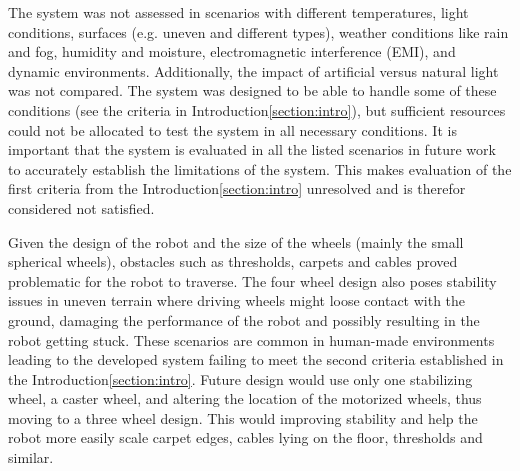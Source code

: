 \begin{comment}
As seen in the Results\:\ref{section:results}, the system achieved consistent SLAM maps during testing scenarios lasting over one hour. The fifth criteria (see Introduction\:\ref{section:intro}) was therefor fulfilled by the system. This indicates that the algorithms have sufficient performance for longer sessions (as is supported by research for SLAM Toolbox\:\cite{macenski_slam_2021} and Navigation2\:\cite{macenski_marathon_2020}). Additionally, the robot design, in terms of storage (for the map) and energy storage, proved sufficient for longer mapping sessions.
\end{comment}


The system was not assessed in scenarios with different temperatures, light conditions, surfaces (e.g. uneven and different types), weather conditions like rain and fog, humidity and moisture, electromagnetic interference (EMI), and dynamic environments. Additionally, the impact of artificial versus natural light was not compared.
The system was designed to be able to handle some of these conditions (see the criteria in Introduction\:\ref{section:intro}), but sufficient resources could not be allocated to test the system in all necessary conditions. It is important that the system is evaluated in all the listed scenarios in future work to accurately establish the limitations of the system.
This makes evaluation of the first criteria from the Introduction\:\ref{section:intro} unresolved and is therefor considered not satisfied.



Given the design of the robot and the size of the wheels (mainly the small spherical wheels), obstacles such as thresholds, carpets and cables proved problematic for the robot to traverse. 
The four wheel design also poses stability issues in uneven terrain where driving wheels might loose contact with the ground, damaging the performance of the robot and possibly resulting in the robot getting stuck. 
These scenarios are common in human-made environments leading to the developed system failing to meet the second criteria established in the Introduction\:\ref{section:intro}.
Future design would use only one stabilizing wheel, a caster wheel, and altering the location of the motorized wheels, thus moving to a three wheel design. This would improving stability and help the robot more easily scale carpet edges, cables lying on the floor, thresholds and similar. 

